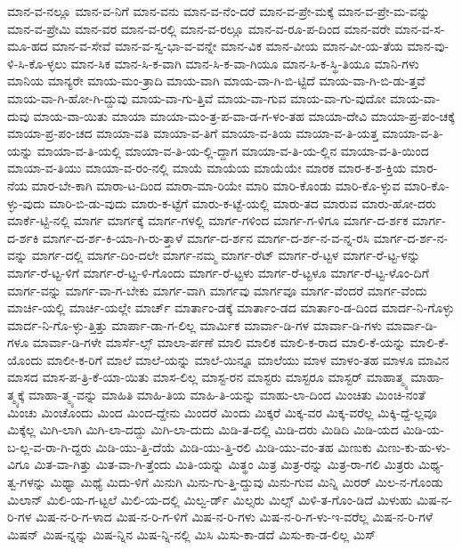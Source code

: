 {ಮಾನ-ವ-ನಲ್ಲೂ
ಮಾನ-ವ-ನಿಗೆ
ಮಾನ-ವನು
ಮಾನ-ವ-ನೆಂ-ದರೆ
ಮಾನ-ವ-ಪ್ರೇ-ಮಕ್ಕೆ
ಮಾನ-ವ-ಪ್ರೇ-ಮ-ವನ್ನು
ಮಾನ-ವ-ಪ್ರೇಮಿ
ಮಾನ-ವರ
ಮಾನ-ವ-ರಲ್ಲಿ
ಮಾನ-ವ-ರಲ್ಲೂ
ಮಾನ-ವ-ರೂ-ಪ-ದಿಂದ
ಮಾನ-ವರೇ
ಮಾನ-ವ-ಸ-ಮೂ-ಹದ
ಮಾನ-ವ-ಸೇವೆ
ಮಾನ-ವ-ಸ್ವ-ಭಾ-ವ-ವನ್ನೇ
ಮಾನ-ವಿಕ
ಮಾನ-ವೀಯ
ಮಾನ-ವೀ-ಯ-ತೆಯ
ಮಾನ-ವು-ಳಿ-ಸಿ-ಕೊ-ಳ್ಳಲು
ಮಾನ-ಸಿಕ
ಮಾನ-ಸಿ-ಕ-ವಾಗಿ
ಮಾನ-ಸಿ-ಕ-ವಾ-ಗಿಯೂ
ಮಾನ-ಸಿ-ಕ-ಸ್ಥಿ-ತಿಯೂ
ಮಾನಿ-ಗಳು
ಮಾನಿಯ
ಮಾನ್ಯರೇ
ಮಾಯ-ಮಂ-ತ್ರಾದಿ
ಮಾಯ-ವಾಗಿ
ಮಾಯ-ವಾ-ಗಿ-ಬಿ-ಟ್ಟಿದೆ
ಮಾಯ-ವಾ-ಗಿ-ಬಿ-ಡು-ತ್ತವೆ
ಮಾಯ-ವಾ-ಗಿ-ಹೋ-ಗಿ-ದ್ದುವು
ಮಾಯ-ವಾ-ಗು-ತ್ತಿವೆ
ಮಾಯ-ವಾ-ಗುವ
ಮಾಯ-ವಾ-ಗು-ವುದೋ
ಮಾಯ-ವಾ-ದುವು
ಮಾಯ-ವಾ-ಯಿತು
ಮಾಯಾ
ಮಾಯಾ-ಮಂ-ತ್ರ-ಪ-ವಾ-ಡ-ಗ-ಳಂ-ತಹ
ಮಾಯಾ-ದೇವಿ
ಮಾಯಾ-ಪ್ರ-ಪಂ-ಚಕ್ಕೆ
ಮಾಯಾ-ಪ್ರ-ಪಂ-ಚದ
ಮಾಯಾ-ವತಿ
ಮಾಯಾ-ವ-ತಿಗೆ
ಮಾಯಾ-ವ-ತಿಯ
ಮಾಯಾ-ವ-ತಿ-ಯತ್ತ
ಮಾಯಾ-ವ-ತಿ-ಯನ್ನು
ಮಾಯಾ-ವ-ತಿ-ಯಲ್ಲಿ
ಮಾಯಾ-ವ-ತಿ-ಯ-ಲ್ಲಿ-ದ್ದಾಗ
ಮಾಯಾ-ವ-ತಿ-ಯ-ಲ್ಲಿನ
ಮಾಯಾ-ವ-ತಿ-ಯಿಂದ
ಮಾಯಾ-ವ-ತಿಯು
ಮಾಯಾ-ವ-ರಂ-ನಲ್ಲಿ
ಮಾಯೆ
ಮಾಯೆಯ
ಮಾಯೆಯೇ
ಮಾರಕ
ಮಾರ-ಕ-ಶ-ಕ್ತಿಯ
ಮಾರ-ನೆಯ
ಮಾರ-ಬೇ-ಕಾಗಿ
ಮಾರಾ-ಟ-ದಿಂದ
ಮಾರಾ-ಮಾ-ರಿಯೇ
ಮಾರಿ
ಮಾರಿ-ಕೊಂಡು
ಮಾರಿ-ಕೊ-ಳ್ಳುವ
ಮಾರಿ-ಕೊ-ಳ್ಳು-ವುದು
ಮಾರಿ-ಬಿ-ಡು-ವುದು
ಮಾರು-ಕ-ಟ್ಟೆಗೆ
ಮಾರು-ಕ-ಟ್ಟೆ-ಯಲ್ಲಿ
ಮಾರು-ತದ
ಮಾರುವ
ಮಾರು-ಹೋ-ದರು
ಮಾರ್ಕೆ-ಟ್ಟಿ-ನಲ್ಲಿ
ಮಾರ್ಗ
ಮಾರ್ಗಕ್ಕೆ
ಮಾರ್ಗ-ಗಳಲ್ಲಿ
ಮಾರ್ಗ-ಗಳಿಂದ
ಮಾರ್ಗ-ಗ-ಳಿಗೂ
ಮಾರ್ಗ-ದ-ರ್ಶಕ
ಮಾರ್ಗ-ದ-ರ್ಶಕಿ
ಮಾರ್ಗ-ದ-ರ್ಶ-ಕಿ-ಯಾ-ಗಿ-ರು-ತ್ತಾಳೆ
ಮಾರ್ಗ-ದ-ರ್ಶನ
ಮಾರ್ಗ-ದ-ರ್ಶ-ನ-ವ-ನ್ನ-ರಸಿ
ಮಾರ್ಗ-ದ-ರ್ಶ-ನ-ವನ್ನು
ಮಾರ್ಗ-ದಲ್ಲಿ
ಮಾರ್ಗ-ದಿಂ-ದಲೇ
ಮಾರ್ಗ-ನಮ್ಮ
ಮಾರ್ಗ-ರೆಟ್
ಮಾರ್ಗ-ರೆ-ಟ್ಟಳ
ಮಾರ್ಗ-ರೆ-ಟ್ಟ-ಳನ್ನು
ಮಾರ್ಗ-ರೆ-ಟ್ಟ-ಳಿಗೆ
ಮಾರ್ಗ-ರೆ-ಟ್ಟ-ಳಿ-ಗೊಂದು
ಮಾರ್ಗ-ರೆ-ಟ್ಟಳು
ಮಾರ್ಗ-ರೆ-ಟ್ಟಳೂ
ಮಾರ್ಗ-ರೆ-ಟ್ಟ-ಳೊಂ-ದಿಗೆ
ಮಾರ್ಗ-ವನ್ನು
ಮಾರ್ಗ-ವಾ-ಗ-ಬೇಕು
ಮಾರ್ಗ-ವಾಗಿ
ಮಾರ್ಗವು
ಮಾರ್ಗವೂ
ಮಾರ್ಗ-ವೆಂದರೆ
ಮಾರ್ಗ-ವೆಂದು
ಮಾರ್ಚಿ-ಯಲ್ಲಿ
ಮಾರ್ಚಿ-ಯಲ್ಲೇ
ಮಾರ್ಚ್
ಮಾರ್ತಾಂ-ಡಕ್ಕೆ
ಮಾರ್ತಾಂ-ಡದ
ಮಾರ್ತಾಂ-ಡ-ದಿಂದ
ಮಾರ್ದ-ನಿ-ಗೊಳ್ಳು
ಮಾರ್ದ-ನಿ-ಗೊ-ಳ್ಳು-ತ್ತಿತ್ತು
ಮಾರ್ಪಾ-ಡಾ-ಗ-ಲಿಲ್ಲ
ಮಾರ್ಮಿಕ
ಮಾರ್ವಾ-ಡಿ-ಗಳ
ಮಾರ್ವಾ-ಡಿ-ಗಳು
ಮಾರ್ವಾ-ಡಿ-ಗಳೂ
ಮಾರ್ವಾ-ಡಿ-ಗಳೇ
ಮಾರ್ಸೆ-ಲ್ಸ್
ಮಾಲಾ-ರ್ಪಣೆ
ಮಾಲಿ
ಮಾಲಿಕ
ಮಾಲಿ-ಕ-ರಾದ
ಮಾಲಿ-ಕೆ-ಯನ್ನು
ಮಾಲಿ-ಕೆ-ಯೊಂದು
ಮಾಲೀ-ಕ-ರಿಗೆ
ಮಾಲೆ
ಮಾಲೆ-ಯನ್ನು
ಮಾಲೆ-ಯಿನ್ನೂ
ಮಾಲೆಯು
ಮಾಳ
ಮಾಳಂ-ತಹ
ಮಾಳೂ
ಮಾವಿನ
ಮಾಸದ
ಮಾಸ-ಪ-ತ್ರಿ-ಕೆ-ಯಾ-ಯಿತು
ಮಾಸ-ಲಿಲ್ಲ
ಮಾಸ್ಟ-ರನ
ಮಾಸ್ಟರು
ಮಾಸ್ಟರೂ
ಮಾಸ್ಟರ್
ಮಾಹಾತ್ಮ್ಯ
ಮಾಹಾ-ತ್ಮ್ಯಕ್ಕೆ
ಮಾಹಾ-ತ್ಮ್ಯ-ವನ್ನು
ಮಾಹಿತಿ
ಮಾಹಿ-ತಿಯ
ಮಾಹಿ-ತಿ-ಯನ್ನು
ಮಾಹು-ಲಾ-ದಿಂದ
ಮಿಂಚಿತು
ಮಿಂಚಿ-ನಂತೆ
ಮಿಂಚು
ಮಿಂಚೊಂದು
ಮಿಂದ
ಮಿಂದ-ದ್ದೇನು
ಮಿಂದರೆ
ಮಿಂದು
ಮಿಕ್ಕರೆ
ಮಿಕ್ಕ-ವರ
ಮಿಕ್ಕ-ವರೆಲ್ಲ
ಮಿಕ್ಕಿ-ದ್ದೆ-ಲ್ಲವೂ
ಮಿಕ್ಕೆಲ್ಲ
ಮಿಗಿ-ಲಾಗಿ
ಮಿಗಿ-ಲಾ-ದದ್ದು
ಮಿಗಿ-ಲಾ-ದುದು
ಮಿಡಿ-ತ-ದಲ್ಲಿ
ಮಿಡಿ-ದರು
ಮಿಡಿದಿ
ಮಿಡಿ-ಯದ
ಮಿಡಿ-ಯ-ಬ-ಲ್ಲ-ವ-ರಾ-ಗಿ-ದ್ದರು
ಮಿಡಿ-ಯು-ತ್ತಿ-ದೆಯೆ
ಮಿಡಿ-ಯು-ತ್ತಿ-ರಲಿ
ಮಿಡಿ-ಯು-ವಂ-ತಹ
ಮಿಣುಕು
ಮಿಣು-ಕು-ಹು-ಳು-ವಿಗೂ
ಮಿತ-ವಾ-ಗಿತ್ತು
ಮಿತ-ವಾ-ಗಿ-ತ್ತೆಂದು
ಮಿತಿ-ಯನ್ನು
ಮಿತ್ಥಂ
ಮಿತ್ರ
ಮಿತ್ರ-ರನ್ನು
ಮಿತ್ರ-ರಾ-ಗಲಿ
ಮಿತ್ರರು
ಮಿಥ್ಯ-ತ್ವ-ಗಳನ್ನು
ಮಿಥ್ಯಾ
ಮಿಥ್ಯೆ
ಮಿದು-ಳಿಗೆ
ಮಿನುಗಿ
ಮಿನು-ಗು-ತ್ತಿ-ದ್ದುವು
ಮಿನು-ಗುವ
ಮಿನ್ನಿ
ಮಿರರ್
ಮಿಲ-ನ-ಗೊಂಡು
ಮಿಲಾನ್
ಮಿಲಿ-ಯ-ಗ-ಟ್ಟಲೆ
ಮಿಲಿ-ಯ-ದಲ್ಲಿ
ಮಿಲ್ವ-ರ್ಡ್
ಮಿಲ್ಸರು
ಮಿಲ್ಸ್
ಮಿಳಿ-ತ-ಗೊಂ-ಡಿದೆ
ಮಿಳುಹು
ಮಿಷ-ನ-ರಿ-ಗಳ
ಮಿಷ-ನ-ರಿ-ಗ-ಳಾದ
ಮಿಷ-ನ-ರಿ-ಗ-ಳಿಗೆ
ಮಿಷ-ನ-ರಿ-ಗಳು
ಮಿಷ-ನ-ರಿ-ಗ-ಳು-ಇ-ವರೆಲ್ಲ
ಮಿಷ-ನ-ರಿ-ಗಳೆ
ಮಿಷನ್
ಮಿಷ-ನ್ನನ್ನು
ಮಿಷ-ನ್ನಿನ
ಮಿಷ-ನ್ನಿ-ನಲ್ಲಿ
ಮಿಸಿ
ಮಿಸು-ಕಾ-ಡದೆ
ಮಿಸು-ಕಾ-ಡ-ಲಿಲ್ಲ
ಮಿಸ್
}
